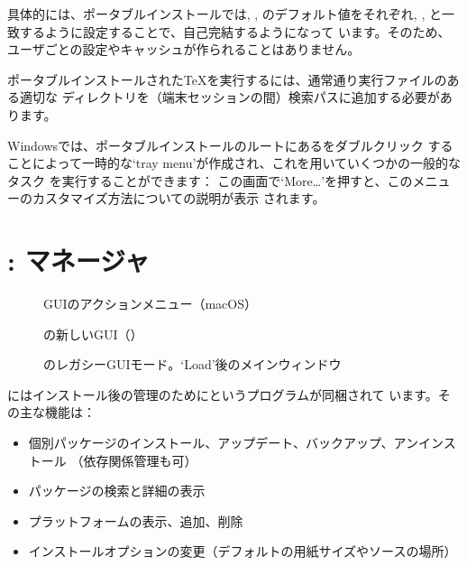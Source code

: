 \documentclass[uplatex,dvipdfmx]{jsarticle}
\begin{document}
具体的には、ポータブルインストールでは, , のデフォルト値をそれぞれ, ,
と一致するように設定することで、自己完結するようになって
います。そのため、ユーザごとの設定やキャッシュが作られることはありません。

ポータブルインストールされた\TeX を実行するには、通常通り実行ファイルのある適切な
ディレクトリを（端末セッションの間）検索パスに追加する必要があります。

Windowsでは、ポータブルインストールのルートにあるをダブルクリック
することによって一時的な`tray menu'が作成され、これを用いていくつかの一般的なタスク
を実行することができます：
%
\medskip
{}
\smallskip
%
この画面で`More\ldots'を押すと、このメニューのカスタマイズ方法についての説明が表示
されます。

\section{: \TL マネージャ}
\label{sec:tlmgr}

\begin{figure}[tb]
\caption{ GUIのアクションメニュー（macOS）}
\label{fig:tlshell}
\end{figure}

\begin{figure}[tb]
\caption{の新しい{GUI}（）}
\label{fig:tlcockpit}
\end{figure}

\begin{figure}[tb]
\caption{のレガシーGUIモード。`Load'後のメインウィンドウ}
\label{fig:tlmgr-gui}
\end{figure}

\TL にはインストール後の\TL 管理のためにというプログラムが同梱されて
います。その主な機能は：
%
\begin{itemize}
\item 個別パッケージのインストール、アップデート、バックアップ、アンインストール
  （依存関係管理も可）
\item パッケージの検索と詳細の表示
\item プラットフォームの表示、追加、削除
\item インストールオプションの変更（デフォルトの用紙サイズやソースの場所）
\end{itemize}
\end{document}
